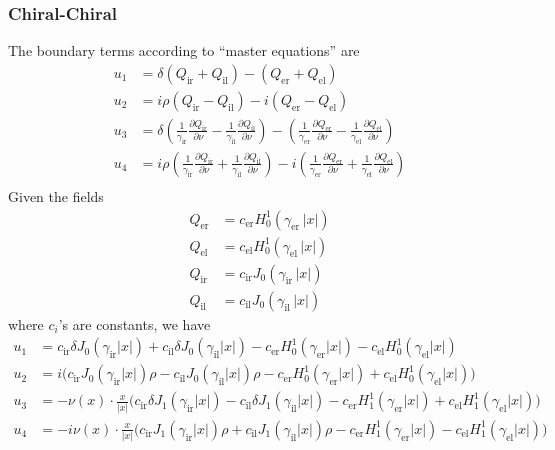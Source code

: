 \subsubsection{Chiral-Chiral}

The boundary terms according to ``master equations'' are
\begin{align*}
  u_1 &= \delta(Q_\text{ir} + Q_\text{il}) - (Q_\text{er} + Q_\text{el})\\
  u_2 &= i\rho(Q_\text{ir} - Q_\text{il}) -i(Q_\text{er} - Q_\text{el}) \\
  u_3 &=\delta\left(\frac{1}{\gamma_\text{ir}}\frac{\partial Q_\text{ir}}{\partial\nu} - \frac{1}{\gamma_\text{il}}\frac{\partial Q_\text{il}}{\partial\nu}\right) -\left(\frac{1}{\gamma_\text{er}}\frac{\partial Q_\text{er}}{\partial\nu} - \frac{1}{\gamma_\text{el}}\frac{\partial Q_\text{el}}{\partial\nu}\right) \\
  u_4 &=i\rho\left(\frac{1}{\gamma_\text{ir}}\frac{\partial Q_\text{ir}}{\partial\nu} + \frac{1}{\gamma_\text{il}}\frac{\partial Q_\text{il}}{\partial\nu}\right) -i\left(\frac{1}{\gamma_\text{er}}\frac{\partial Q_\text{er}}{\partial\nu} + \frac{1}{\gamma_\text{el}}\frac{\partial Q_\text{el}}{\partial\nu}\right) \\
\end{align*}
Given the fields
\begin{align*}
  Q_\text{er} &= c_\text{er}H_0^1(\gamma_\text{er}\,|x|) \\
  Q_\text{el} &= c_\text{el}H_0^1(\gamma_\text{el}\,|x|) \\
  Q_\text{ir} &= c_\text{ir}J_0(\gamma_\text{ir}\,|x|) \\
  Q_\text{il} &= c_\text{il}J_0(\gamma_\text{il}\,|x|)
\end{align*}
where $c_i$'s are constants, we have
\begin{align*}
  u_1 &= c_\text{ir} \delta J_0(\gamma_\text{ir}|x|)+c_\text{il} \delta J_0(\gamma_\text{il}|x|)-c_\text{er} H_0^1(\gamma_\text{er}|x|)-c_\text{el} H_0^1(\gamma_\text{el}|x|) \\
  u_2 &= i \bigl(c_\text{ir} J_0(\gamma_\text{ir}|x|) \rho-c_\text{il} J_0(\gamma_\text{il}|x|) \rho-c_\text{er} H_0^1(\gamma_\text{er}|x|)+c_\text{el} H_0^1(\gamma_\text{el}|x|)\bigr) \\
  u_3 &= -\nu(x)\cdot\frac{x}{|x|} \bigl(c_\text{ir} \delta J_1(\gamma_\text{ir}|x|)-c_\text{il} \delta J_1(\gamma_\text{il}|x|)-c_\text{er} H_1^1(\gamma_\text{er}|x|)+c_\text{el} H_1^1(\gamma_\text{el}|x|)\bigr) \\
  u_4 &= -i \nu(x)\cdot\frac{x}{|x|} \bigl(c_\text{ir} J_1(\gamma_\text{ir}|x|) \rho+c_\text{il} J_1(\gamma_\text{il}|x|) \rho-c_\text{er} H_1^1(\gamma_\text{er}|x|)-c_\text{el} H_1^1(\gamma_\text{el}|x|)\bigr) \\
\end{align*}

